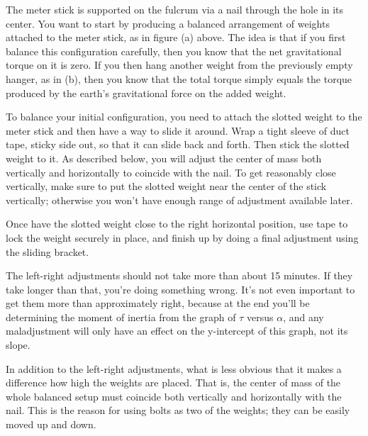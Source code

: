 

The meter stick is supported on the fulcrum via a nail
through the hole in its center. You want to start by
producing a balanced arrangement of weights attached to the
meter stick, as in figure (a) above. The idea is that if you
first balance this configuration carefully, then you know
that the net gravitational torque on it is zero. If you then
hang another weight from the previously empty hanger, as in
(b), then you know that the total torque simply equals the
torque produced by the earth's gravitational force
on the added weight.


To balance your initial configuration, you need to attach the
slotted weight to the meter stick and then have a way to slide
it around. Wrap a tight sleeve of duct
tape, sticky side out, so that it can slide back and forth.
Then stick the slotted weight to it. As described below, you will
adjust the center of mass both vertically and horizontally to coincide
with the nail. To get reasonably close vertically, make sure to put the
slotted weight near the center of the stick vertically; otherwise you
won't have enough range of adjustment available later.

Once have the slotted weight close to the right horizontal position,
use tape to lock the weight securely in place, and finish up by
doing a final adjustment using the sliding bracket.

The left-right adjustments should not take more than about 15 minutes.
If they take longer than that, you're doing something wrong. It's not
even important to get them more than approximately right, because
at the end you'll be determining the moment of inertia from the graph
of $\tau$ versus $\alpha$, and any maladjustment will only have an effect on the y-intercept of
this graph, not its slope.

In addition to the left-right adjustments, what is less obvious that it
makes a difference how high the weights are placed. That is,
the center of mass of the whole balanced setup must coincide
both vertically and horizontally with the nail. This is the reason
for using bolts as two of the weights; they can be easily moved up and down.

